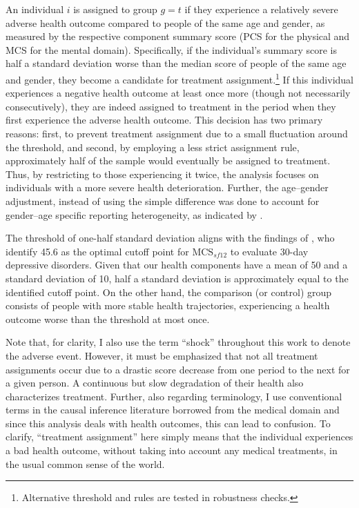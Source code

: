 An individual $i$ is assigned to group $g=t$ if they experience a relatively severe adverse health outcome
compared to people of the same age and gender, as measured by the respective component summary score (PCS
for the physical and MCS for the mental domain). Specifically, if the individual's summary score is half
a standard deviation worse than the median score of people of the same age and gender, they become a candidate for
treatment assignment.\footnote{Alternative threshold and rules are tested in robustness checks.} If
this individual experiences a negative health outcome at least once more (though not necessarily
consecutively), they are indeed assigned to treatment in the period when they first experience the adverse
health outcome. This decision has two primary reasons: first, to prevent treatment assignment due to a small
fluctuation around the threshold, and second, by employing a less strict assignment rule, approximately half of
the sample would eventually be assigned to treatment. Thus, by restricting to those experiencing it twice, the
analysis focuses on individuals with a more severe health deterioration. Further, the age--gender adjustment, 
instead of using the simple difference was done to account for gender--age specific reporting heterogeneity, as
indicated by \textcite{ziebarth2010measurement}. 


The threshold of one-half standard deviation aligns with the findings of
\textcite[568]{vilagut.etal2013mental}, who identify 45.6 as the optimal cutoff point for $\text{MCS}_{sf12}$
to evaluate 30-day depressive disorders. Given that our health components have a mean of 50 and a standard
deviation of 10, half a standard deviation is approximately equal to the identified cutoff point. On the other
hand, the comparison (or control) group consists of people with more stable health trajectories, experiencing a
health outcome worse than the threshold at most once.

Note that, for clarity, I also use the term ``shock'' throughout this work to denote the adverse event.
However, it must be emphasized that not all treatment assignments occur due to a drastic score decrease from
one period to the next for a given person. A continuous but slow degradation of their health also characterizes
treatment.  Further, also regarding terminology, I use conventional terms in the causal inference literature
borrowed from the medical domain and since this analysis deals with health outcomes, this can lead to confusion.
To clarify, ``treatment assignment'' here simply means that the individual experiences a bad health outcome,
without taking into account any medical treatments, in the usual common sense of the world.



